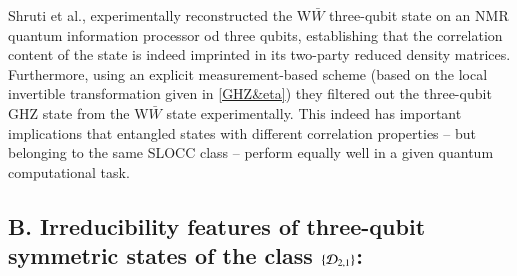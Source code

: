 {Shruti et al., \cite{arvind} experimentally reconstructed the W$\bar W$ three-qubit state on an NMR quantum information processor od three qubits,  establishing that the correlation content of the state is indeed imprinted in  its two-party reduced density matrices. Furthermore, using an explicit measurement-based scheme (based on the local invertible transformation given in \eqref{GHZ&eta})  they filtered out the  three-qubit GHZ state from the W$\bar W$ state experimentally. This indeed has important implications that  entangled states with different correlation properties -- but  belonging to the same SLOCC class -- perform equally well in a given quantum computational task.

\subsection*{B. Irreducibility features of three-qubit symmetric states of the class $\{{\cal D}_{2,1} \}$:}

}
